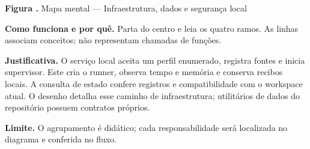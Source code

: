 {\small\textbf{Figura \thefigure.} Mapa mental --- Infraestrutura, dados e segurança local}\par\smallskip
\noindent\textbf{Como funciona e por quê.} Parta do centro e leia os quatro ramos. As linhas associam conceitos; não representam chamadas de funções.\par
\noindent\textbf{Justificativa.} O serviço local aceita um perfil enumerado, registra fontes e inicia supervisor. Este cria o runner, observa tempo e memória e conserva recibos locais. A consulta de estado confere registros e compatibilidade com o workspace atual. O desenho detalha esse caminho de infraestrutura; utilitários de dados do repositório possuem contratos próprios.\par
\noindent\textbf{Limite.} O agrupamento é didático; cada responsabilidade será localizada no diagrama e conferida no fluxo.\par\smallskip
{}
